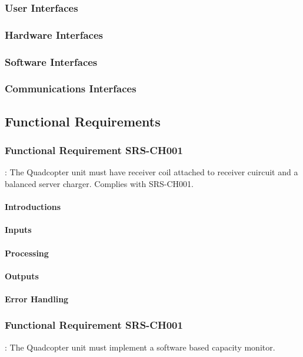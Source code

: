 \documentclass[a4paper]{article}
\begin{document}
\subsubsection{User Interfaces}
\subsubsection{Hardware Interfaces}
\subsubsection{Software Interfaces}
\subsubsection{Communications Interfaces}

\subsection{Functional Requirements}

\subsubsection{Functional Requirement SRS-CH001}
: The Quadcopter unit must have receiver coil attached to receiver cuircuit and a balanced server charger. Complies with {SRS-CH001}.
\paragraph{Introductions}
\paragraph{Inputs}
\paragraph{Processing}
\paragraph{Outputs}
\paragraph{Error Handling}

\subsubsection{Functional Requirement SRS-CH001}
: The Quadcopter unit must implement a software based capacity monitor.
\end{document}
